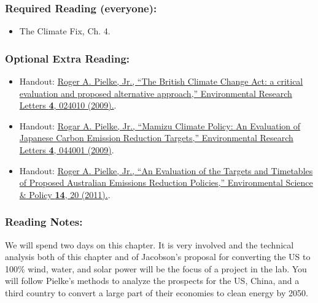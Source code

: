\documentclass[
]{article}
\providecommand{\tightlist}{%
  \setlength{\itemsep}{0pt}\setlength{\parskip}{0pt}}
\begin{document}
\hypertarget{required-reading-everyone-19}{%
\subsubsection{Required Reading
(everyone):}\label{required-reading-everyone-19}}

\begin{itemize}
\tightlist
\item
  The Climate Fix, Ch. 4.
\end{itemize}

\hypertarget{optional-extra-reading}{%
\subsubsection{Optional Extra Reading:}\label{optional-extra-reading}}

\begin{itemize}
\tightlist
\item
  Handout:
  \href{http://iopscience.iop.org/article/10.1088/1748-9326/4/2/024010/meta}{Roger
  A. Pielke, Jr., ``The British Climate Change Act: a critical
  evaluation and proposed alternative approach,'' Environmental Research
  Letters \textbf{4}, 024010 (2009).}.
\item
  Handout:
  \href{http://iopscience.iop.org/article/10.1088/1748-9326/4/4/044001/meta}{Rogar
  A. Pielke, Jr., ``Mamizu Climate Policy: An Evaluation of Japanese
  Carbon Emission Reduction Targets,'' Environmental Research Letters
  \textbf{4}, 044001 (2009)}.
\item
  Handout:
  \href{https://www-sciencedirect-com.proxy.library.vanderbilt.edu/science/article/pii/S1462901110001383}{Roger
  A. Pielke, Jr., ``An Evaluation of the Targets and Timetables of
  Proposed Australian Emissions Reduction Policies,'' Environmental
  Science \& Policy \textbf{14}, 20 (2011).}.
\end{itemize}

\hypertarget{reading-notes-19}{%
\subsubsection{Reading Notes:}\label{reading-notes-19}}

We will spend two days on this chapter. It is very involved and the
technical analysis both of this chapter and of Jacobson's proposal for
converting the US to 100\% wind, water, and solar power will be the
focus of a project in the lab. You will follow Pielke's methods to
analyze the prospects for the US, China, and a third country to convert
a large part of their economies to clean energy by 2050.
\end{document}
